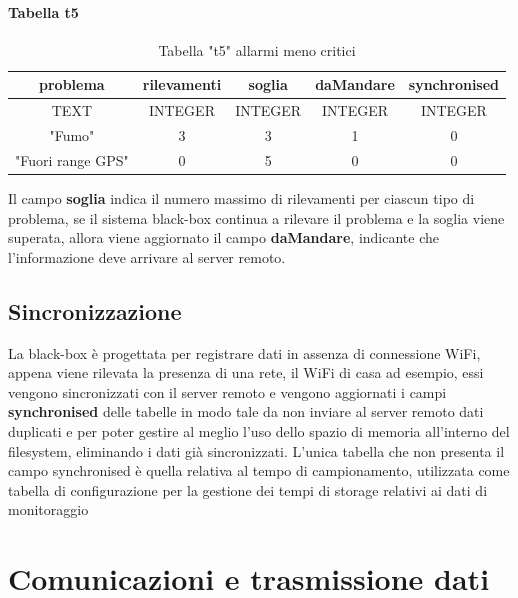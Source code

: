 \documentclass[12pt, a4paper, italian]{report}
\numberwithin{figure}{chapter}
\numberwithin{table}{chapter}
\begin{document}
\paragraph{Tabella t5}
\begin{table}[h!]
  \centering 
  \begin{adjustbox}{max width=\textwidth}
    \begin{tabular}{|c|c|c|c|c|}
      \hline
      \textbf{problema} & \textbf{rilevamenti} & \textbf{soglia} & \textbf{daMandare} & \textbf{synchronised} \\
      \hline
      TEXT & INTEGER & INTEGER & INTEGER & INTEGER \\
      \hline
      "Fumo" & 3 & 3 & 1 & 0 \\
      \hline
      "Fuori range GPS" & 0 & 5 & 0 & 0 \\
      \hline
    \end{tabular}
  \end{adjustbox}
  \caption{Tabella "t5" allarmi meno critici}
  \label{tab:t5 allarmi meno critici}
\end{table}
Il campo \textbf{soglia} indica il numero massimo di rilevamenti per ciascun tipo di problema, se il sistema black-box continua a rilevare il problema e la soglia viene superata, allora viene aggiornato il campo \textbf{daMandare}, indicante che l'informazione deve arrivare al server remoto.

\subsection{Sincronizzazione}
\label{sec:Sincronizzazione}
La black-box è progettata per registrare dati in assenza di connessione WiFi, appena viene rilevata la presenza di una rete, il WiFi di casa ad esempio, essi vengono sincronizzati con il server remoto e vengono aggiornati i campi \textbf{synchronised} delle tabelle in modo tale da non inviare al server remoto dati duplicati e per poter gestire al meglio l'uso dello spazio di memoria all'interno del filesystem, eliminando i dati già sincronizzati. 
L'unica tabella che non presenta il campo synchronised è quella relativa al tempo di campionamento, utilizzata come tabella di configurazione per la gestione dei tempi di storage relativi ai dati di monitoraggio

\section{Comunicazioni e trasmissione dati}
\end{document}
